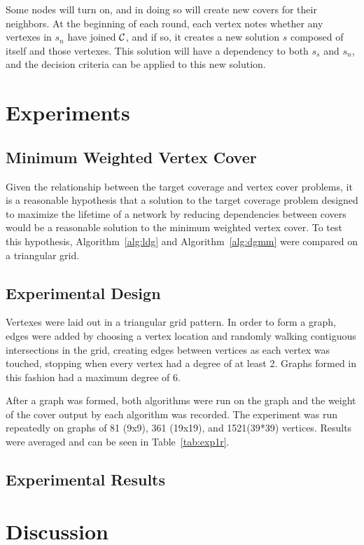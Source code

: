 Some nodes will turn on, and in doing so will create new covers for their neighbors. At the beginning of each round, each vertex notes whether any vertexes in $s_n$ have joined ${\mathcal C}$, and if so, it creates a new solution $s$ composed of itself and those vertexes. This solution will have a dependency to both $s_s$ and $s_n$, and the decision criteria can be applied to this new solution. 
\section{Experiments}
\label{sec:experiment}
\subsection{Minimum Weighted Vertex Cover}
\label{sub:mwvc-exp}
Given the relationship between the target coverage and vertex cover problems, it is a reasonable hypothesis that a solution to the target coverage problem designed to maximize the lifetime of a network by reducing dependencies between covers would be a reasonable solution to the minimum weighted vertex cover. To test this hypothesis, Algorithm~\ref{alg:ldg} and Algorithm~\ref{alg:dgmm} were compared on a triangular grid.
\subsection{Experimental Design}
Vertexes were laid out in a triangular grid pattern. In order to form a graph, edges were added by choosing a vertex location and randomly walking contiguous intersections in the grid, creating edges between vertices  as each vertex was touched, stopping when every vertex had a degree of at least 2. Graphs formed in this fashion had a maximum degree of 6.

After a graph was formed, both algorithms were run on the graph and the weight of the cover output by each algorithm was recorded. The experiment was run repeatedly on graphs of 81 (9x9), 361 (19x19), and 1521(39*39) vertices. Results were averaged and can be seen in Table~\ref{tab:exp1r}.  

\subsection{Experimental Results}


\section{Discussion}
\label{sec:discuss}

